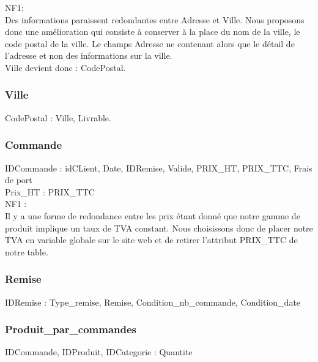 \documentclass[a4paper, 12pt]{report}
\begin{document}
\begin{spacing}{1.2}
NF1:\\
Des informations paraissent redondantes entre Adresse et Ville. Nous proposons donc une amélioration qui consiste à conserver à la place du nom de la ville, le code postal de la ville. Le champs Adresse ne contenant alors que le détail de l'adresse et non des informations sur la ville.\\
Ville devient donc : CodePostal.

\textcolor{colortitre3}{\subsubsection*{\hypertarget{Ville}{Ville}}}

CodePostal : Ville, Livrable.\\

\textcolor{colortitre3}{\subsubsection*{\hypertarget{Commande}{Commande}}}

IDCommande : idCLient, Date, IDRemise, Valide, PRIX\_HT, PRIX\_TTC, Frais de port\\
Prix\_HT : PRIX\_TTC\\

NF1 : \\
Il y a une forme de redondance entre les prix étant donné que notre gamme de produit implique un taux de TVA constant. Nous choisissons donc de placer notre TVA en variable globale sur le site web et de retirer l'attribut PRIX\_TTC de notre table.\\


\textcolor{colortitre3}{\subsubsection*{\hypertarget{Remise}{Remise}}}

IDRemise : Type\_remise, Remise, Condition\_nb\_commande, Condition\_date\\


\textcolor{colortitre3}{\subsubsection*{\hypertarget{ppc}{Produit\_par\_commandes}}}

IDCommande, IDProduit, IDCategorie : Quantite\\



\end{spacing}
\end{document}
